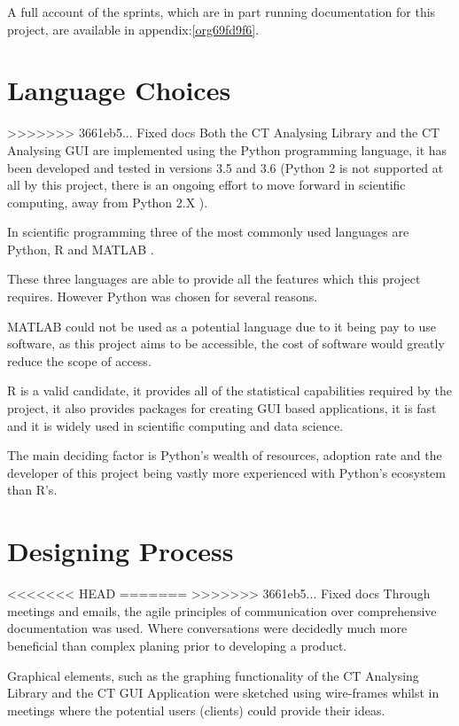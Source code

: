 \documentclass[11pt]{report}
\begin{document}
A full account of the sprints, which are in part running documentation for this project, are available in appendix:\ref{org69fd9f6}.

\section{Language Choices}
\label{sec:org56d90eb}
>>>>>>> 3661eb5... Fixed docs
Both the CT Analysing Library and the CT Analysing GUI are implemented using the Python programming language, it has been developed and tested in versions 3.5 and 3.6 (Python 2 is not supported at all by this project, there is an ongoing effort to move forward in scientific computing, away from Python 2.X  \cite{Ozgur2016}).

In scientific programming three of the most commonly used languages are Python, R and MATLAB \cite{Ozgur2016}.

These three languages are able to provide all the features which this project requires. However Python was chosen for several reasons.

MATLAB could not be used as a potential language due to it being pay to use software, as this project aims to be accessible, the cost of software would greatly reduce the scope of access.

R is a valid candidate, it provides all of the statistical capabilities required by the project, it also provides packages for creating GUI based applications, it is fast and it is widely used in scientific computing and data science.

The main deciding factor is Python's wealth of resources, adoption rate and the developer of this project being vastly more experienced with Python's ecosystem than R's.

\section{Designing Process}
<<<<<<< HEAD
\label{sec:org8ce0b1a}
=======
\label{sec:org66881da}
>>>>>>> 3661eb5... Fixed docs
Through meetings and emails, the agile principles of communication over comprehensive documentation was used. Where conversations were decidedly much more beneficial than complex planing prior to developing a product.

Graphical elements, such as the graphing functionality of the CT Analysing Library and the CT GUI Application were sketched using wire-frames whilst in meetings where the potential users (clients) could provide their ideas.
\end{document}
